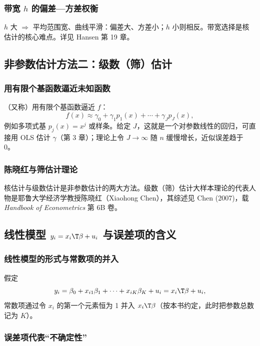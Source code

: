 \subsubsection{带宽 \texorpdfstring{$h$}{h} 的偏差—方差权衡}

$h$ 大 $\Rightarrow$ 平均范围宽、曲线平滑：偏差大、方差小；$h$ 小则相反。带宽选择是核估计的核心难点。详见 Hansen 第 19 章。

\subsection{非参数估计方法二：级数（筛）估计}

\subsubsection{用有限个基函数逼近未知函数}

（又称）用有限个基函数逼近 $f$：
\[
f(x)\approx\gamma_0+\gamma_1p_1(x)+\cdots+\gamma_Jp_J(x),
\]
例如多项式基 $p_j(x)=x^j$ 或样条。给定 $J$，这就是一个对参数线性的回归，可直接用 OLS 估计 $\gamma$（第 3 章）；理论上令 $J\to\infty$ 随 $n$ 缓慢增长，近似误差趋于 0。

\subsubsection{陈晓红与筛估计理论}

核估计与级数估计是非参数估计的两大方法。级数（筛）估计大样本理论的代表人物是耶鲁大学经济学教授陈晓红（Xiaohong Chen），其综述见 Chen (2007)，载 \textit{Handbook of Econometrics} 第 6B 卷。

\subsection{线性模型 \texorpdfstring{$y_i=x_i\T\beta+u_i$}{y\_i = x\_i'beta + u\_i} 与误差项的含义}

\subsubsection{线性模型的形式与常数项的并入}

假定
\[
y_i=\beta_0+x_{i1}\beta_1+\cdots+x_{iK}\beta_K+u_i=x_i\T\beta+u_i,
\]
常数项通过令 $x_i$ 的第一个元素恒为 1 并入 $x_i\T\beta$（按本书约定，此时把参数总数记为 $K$）。

\subsubsection{误差项代表“不确定性”}

